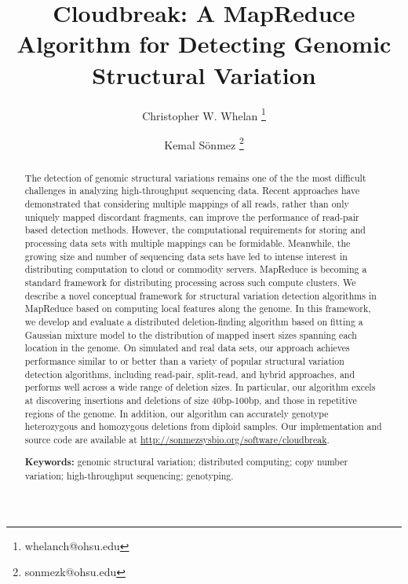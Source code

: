 \documentclass[11pt]{article}
\begin{document}
\title{Cloudbreak: A MapReduce Algorithm for Detecting Genomic Structural Variation}

\author[1,2,4]{Christopher W. Whelan \thanks{whelanch@ohsu.edu}}
\author[1,2,3,4]{Kemal S\"onmez \thanks{sonmezk@ohsu.edu}}


\maketitle

\begin{abstract}
The detection of genomic structural variations remains one of the the most difficult challenges in analyzing high-throughput sequencing data. Recent approaches have demonstrated that considering multiple mappings of all reads, rather than only uniquely mapped discordant fragments, can improve the performance of read-pair based detection methods. However, the computational requirements for storing and processing data sets with multiple mappings can be formidable. Meanwhile, the growing size and number of sequencing data sets have led to intense interest in distributing computation to cloud or commodity servers. MapReduce is becoming a standard framework for distributing processing across such compute clusters. We describe a novel conceptual framework for structural variation detection algorithms in MapReduce based on computing local features along the genome. In this framework, we develop and evaluate a distributed deletion-finding algorithm based on fitting a Gaussian mixture model to the distribution of mapped insert sizes spanning each location in the genome. On simulated and real data sets, our approach achieves performance similar to or better than a variety of popular structural variation detection algorithms, including read-pair, split-read, and hybrid approaches, and performs well across a wide range of deletion sizes. In particular, our algorithm excels at discovering insertions and deletions of size 40bp-100bp, and those in repetitive regions of the genome. In addition, our algorithm can accurately genotype heterozygous and homozygous deletions from diploid samples. Our implementation and source code are available at \url{http://sonmezsysbio.org/software/cloudbreak}.

\medskip
\noindent\textbf{Keywords:} genomic structural variation; distributed computing; copy number variation; high-throughput sequencing; genotyping.
\end{abstract}
\end{document}
